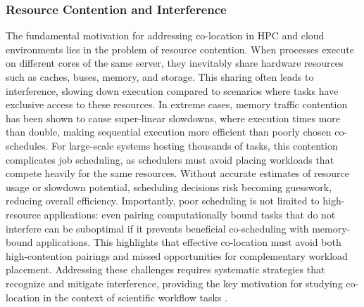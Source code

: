 \subsubsection{Resource Contention and Interference}
\label{sec:background_colocation_interference}
The fundamental motivation for addressing co-location in HPC and cloud environments lies in the problem of resource contention. When processes execute on different cores of the same server, they inevitably share hardware resources such as caches, buses, memory, and storage. This sharing often leads to interference, slowing down execution compared to scenarios where tasks have exclusive access to these resources. In extreme cases, memory traffic contention has been shown to cause super-linear slowdowns, where execution times more than double, making sequential execution more efficient than poorly chosen co-schedules. For large-scale systems hosting thousands of tasks, this contention complicates job scheduling, as schedulers must avoid placing workloads that compete heavily for the same resources. Without accurate estimates of resource usage or slowdown potential, scheduling decisions risk becoming guesswork, reducing overall efficiency. Importantly, poor scheduling is not limited to high-resource applications: even pairing computationally bound tasks that do not interfere can be suboptimal if it prevents beneficial co-scheduling with memory-bound applications. This highlights that effective co-location must avoid both high-contention pairings and missed opportunities for complementary workload placement. Addressing these challenges requires systematic strategies that recognize and mitigate interference, providing the key motivation for studying co-location in the context of scientific workflow tasks \cite{inproceedings}.

